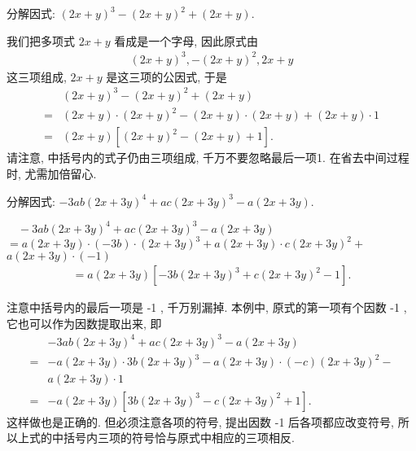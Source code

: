 \begin{example}[切勿漏 1]
	分解因式: $(2 x+y)^{3}-(2 x+y)^{2}+(2 x+y)$.
\end{example}
\begin{solution}
	我们把多项式 $2 x+y$ 看成是一个字母, 因此原式由
	\begin{align*}
		(2 x+y)^{3},-(2 x+y)^{2}, 2 x+y
	\end{align*}
	这三项组成,  $2 x+y$ 是这三项的公因式, 于是
	\begin{align*}
		  & (2 x+y)^{3}-(2 x+y)^{2}+(2 x+y)                               \\
		= & (2 x+y) \cdot(2 x+y)^{2}-(2 x+y) \cdot(2 x+y)+(2 x+y) \cdot 1 \\
		= & (2 x+y)\left[(2 x+y)^{2}-(2 x+y)+1\right] .
	\end{align*}
	请注意, 中括号内的式子仍由三项组成, 千万不要忽略最后一项1. 在省去中间过程时, 尤需加倍留心.
\end{solution}

\begin{example}[注意符号]\label{ex:提公因式-例4-注意符号}
	分解因式: $-3 a b(2 x+3 y)^{4}+a c(2 x+3 y)^{3}-a(2 x+3 y)$.
\end{example}
\begin{solution}
	$\quad-3 a b(2 x+3 y)^{4}+a c(2 x+3 y)^{3}-a(2 x+3 y)$\\
	$=a(2 x+3 y) \cdot(-3 b) \cdot(2 x+3 y)^{3}+a(2 x+3 y) \cdot c(2 x+3 y)^{2}+$ $a(2 x+3 y) \cdot(-1)$
	\begin{align*}
		=a(2 x+3 y)\left[-3 b(2 x+3 y)^{3}+c(2 x+3 y)^{2}-1\right] .
	\end{align*}
\end{solution}
\begin{note}
	注意中括号内的最后一项是 -1 , 千万别漏掉. 本例中, 原式的第一项有个因数 -1 , 它也可以作为因数提取出来, 即
	\begin{align*}
		  & -3 a b(2 x+3 y)^{4}+a c(2 x+3 y)^{3}-a(2 x+3 y)                       \\
		= & -a(2 x+3 y) \cdot 3 b(2 x+3 y)^{3}-a(2 x+3 y) \cdot(-c)(2 x+3 y)^{2}- \\
		  & a(2 x+3 y) \cdot 1                                                    \\
		= & -a(2 x+3 y)\left[3 b(2 x+3 y)^{3}-c(2 x+3 y)^{2}+1\right] .
	\end{align*}
	这样做也是正确的. 但必须注意各项的符号, 提出因数 -1 后各项都应改变符号, 所以上式的中括号内三项的符号恰与原式中相应的三项相反.
\end{note}

